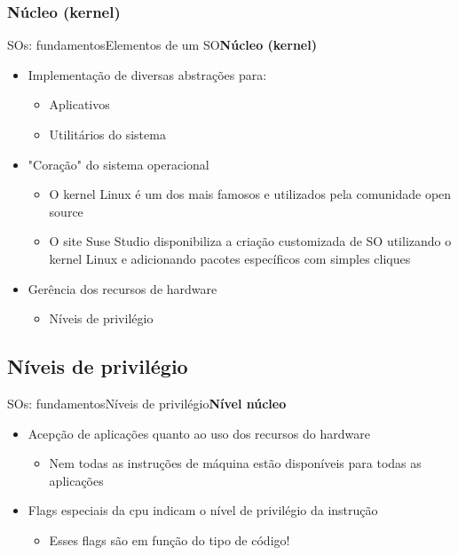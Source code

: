\documentclass{beamer}
\begin{document}
      \subsubsection{Núcleo (kernel)}
        
        \begin{frame}{SOs: fundamentos}{Elementos de um SO}{\bfseries{Núcleo (kernel)}}
          \begin{itemize}
            \item Implementação de diversas abstrações para:
            \begin{itemize}
              \item Aplicativos
              \item Utilitários do sistema
            \end{itemize} 
            \item "Coração" do sistema operacional
            \begin{itemize}
              \item O kernel Linux é um dos mais famosos e utilizados pela comunidade open source
              \item O site Suse Studio disponibiliza a criação customizada de SO utilizando o kernel Linux e adicionando pacotes específicos com simples cliques
            \end{itemize}
            \item Gerência dos recursos de hardware
            \begin{itemize}
              \item Níveis de privilégio
            \end{itemize} 
          \end{itemize}
        \end{frame}

    \subsection{Níveis de privilégio}
    
      \begin{frame}{SOs: fundamentos}{Níveis de privilégio}{\bfseries{Nível núcleo}}
        \begin{itemize}
          \item Acepção de aplicações quanto ao uso dos recursos do hardware
          \begin{itemize}
            \item Nem todas as instruções de máquina estão disponíveis para todas as aplicações
          \end{itemize}
          \item Flags especiais da cpu indicam o nível de privilégio da instrução
          \begin{itemize}
            \item Esses flags são em função do tipo de código!
          \end{itemize}
        \end{itemize}  
      \end{frame}
\end{document}
